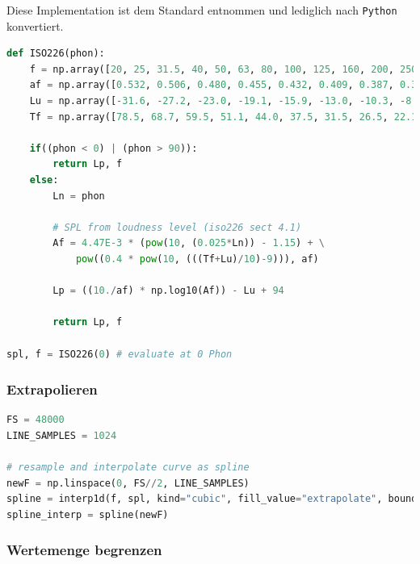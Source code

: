 Diese Implementation ist dem Standard entnommen und lediglich nach
\texttt{Python} konvertiert.

\begin{lstlisting}[language=Python]
def ISO226(phon):
    f = np.array([20, 25, 31.5, 40, 50, 63, 80, 100, 125, 160, 200, 250, 315, 400, 500, 630, 800, 1000, 1250, 1600, 2000, 2500, 3150, 4000, 5000, 6300, 8000, 10000, 12500])
    af = np.array([0.532, 0.506, 0.480, 0.455, 0.432, 0.409, 0.387, 0.367, 0.349, 0.330, 0.315, 0.301, 0.288, 0.276, 0.267, 0.259, 0.253, 0.250, 0.246, 0.244, 0.243, 0.243, 0.243, 0.242, 0.242, 0.245, 0.254, 0.271, 0.301])
    Lu = np.array([-31.6, -27.2, -23.0, -19.1, -15.9, -13.0, -10.3, -8.1, -6.2, -4.5, -3.1, -2.0, -1.1, -0.4, 0.0, 0.3, 0.5, 0.0, -2.7, -4.1, -1.0, 1.7, 2.5, 1.2, -2.1, -7.1, -11.2, -10.7, -3.1])
    Tf = np.array([78.5, 68.7, 59.5, 51.1, 44.0, 37.5, 31.5, 26.5, 22.1, 17.9, 14.4, 11.4, 8.6, 6.2, 4.4, 3.0, 2.2, 2.4, 3.5, 1.7, -1.3, -4.2, -6.0, -5.4, -1.5, 6.0, 12.6, 13.9, 12.3])

    if((phon < 0) | (phon > 90)):
        return Lp, f
    else:
        Ln = phon

        # SPL from loudness level (iso226 sect 4.1)
        Af = 4.47E-3 * (pow(10, (0.025*Ln)) - 1.15) + \
            pow((0.4 * pow(10, (((Tf+Lu)/10)-9))), af)

        Lp = ((10./af) * np.log10(Af)) - Lu + 94

        return Lp, f

spl, f = ISO226(0) # evaluate at 0 Phon
\end{lstlisting}

\hypertarget{extrapolieren}{%
\subsubsection{Extrapolieren}\label{extrapolieren}}

\begin{lstlisting}[language=Python]
FS = 48000
LINE_SAMPLES = 1024

# resample and interpolate curve as spline
newF = np.linspace(0, FS//2, LINE_SAMPLES)
spline = interp1d(f, spl, kind="cubic", fill_value="extrapolate", bounds_error=False)
spline_interp = spline(newF)
\end{lstlisting}

\hypertarget{wertemenge-begrenzen}{%
\subsubsection{Wertemenge begrenzen}\label{wertemenge-begrenzen}}

